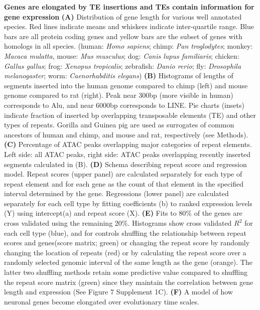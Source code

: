 \textbf{Genes are elongated by TE insertions and TEs contain information for gene expression}
\textbf{(A)} Distribution of gene length for various well annotated species. Red lines indicate means and whiskers indicate inter-quartile range. Blue bars are all protein coding genes and yellow bars are the subset of genes with homologs in all species. (human: \textit{Homo sapiens}; chimp: \textit{Pan troglodytes}; monkey: \textit{Macaca mulatta}, mouse: \textit{Mus musculus}; dog: \textit{Canis lupus familiaris}; chicken: \textit{Gallus gallus}; frog: \textit{Xenopus tropicalis}; zebrafish: \textit{Danio rerio}; fly: \textit{Drosophila melanogaster}; worm: \textit{Caenorhabditis  elegans})
\textbf{(B)} Histograms of lengths of segments inserted into the human genome compared to chimp (left) and mouse genome compared to rat (right). Peak near 300bp (more visible in human) corresponds to Alu, and near 6000bp corresponds to LINE. Pie charts (insets) indicate fraction of inserted bp overlapping transposable elements (TE) and other types of repeats. Gorilla and Guinea pig are used as surrogates of common ancestors of human and chimp, and mouse and rat, respectively (see Methods). 
\textbf{(C)} Percentage of ATAC peaks overlapping major categories of repeat elements. Left side: all ATAC peaks, right side: ATAC peaks overlapping recently inserted segments calculated in (B). 
\textbf{(D)} Schema describing repeat score and regression model. Repeat scores (upper panel) are calculated separately for each type of repeat element and for each gene as the count of that element in the specified interval determined by the gene. Regressions (lower panel) are calculated separately for each cell type by fitting coefficients (b) to ranked expression levels (Y) using intercept(a) and repeat score (X). 
\textbf{(E)} Fits to 80\% of the genes are cross validated using the remaining 20\%. Histograms show cross validated $R^2$ for each cell type (blue), and for controls shuffling the relationship between repeat scores and genes(score matrix; green) or changing the repeat score by randomly changing the location of repeats (red) or by calculating the repeat score over a randomly selected genomic interval of the same length as the gene (orange). The latter two shuffling methods retain some predictive value compared to shuffling the repeat score matrix (green) since they maintain the correlation between gene length and expression (See Figure 7 Supplement 1C).
\textbf{(F)} A model of how neuronal genes become elongated over evolutionary time scales. 
